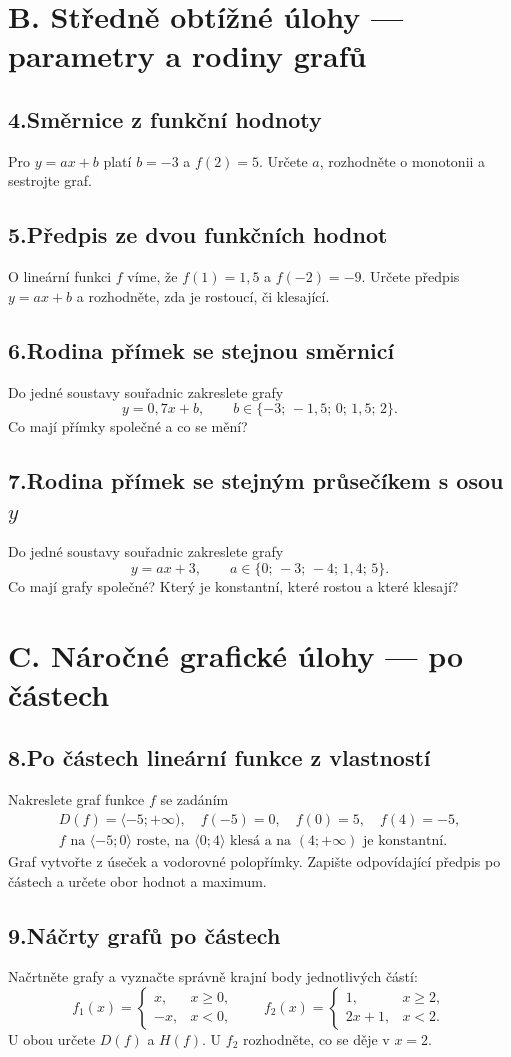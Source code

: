 \documentclass[11pt,a4paper]{article}
\newcommand{\uloha}[2]{\par\needspace{4\baselineskip}\subsection*{#1\enspace #2}}
\begin{document}
\section*{B. Středně obtížné úlohy --- parametry a rodiny grafů}
\uloha{4.}{Směrnice z funkční hodnoty}
Pro $y=ax+b$ platí $b=-3$ a $f(2)=5$. Určete $a$, rozhodněte o monotonii a sestrojte graf.
\uloha{5.}{Předpis ze dvou funkčních hodnot}
O lineární funkci $f$ víme, že $f(1)=1{,}5$ a $f(-2)=-9$. Určete předpis $y=ax+b$ a rozhodněte, zda je rostoucí, či klesající.
\uloha{6.}{Rodina přímek se stejnou směrnicí}
Do jedné soustavy souřadnic zakreslete grafy
\[ y=0{,}7x+b,\qquad b\in\{-3;\,-1{,}5;\,0;\,1{,}5;\,2\}. \]
Co mají přímky společné a co se mění?
\uloha{7.}{Rodina přímek se stejným průsečíkem s osou $y$}
Do jedné soustavy souřadnic zakreslete grafy
\[ y=ax+3,\qquad a\in\{0;\,-3;\,-4;\,1{,}4;\,5\}. \]
Co mají grafy společné? Který je konstantní, které rostou a které klesají?
\section*{C. Náročné grafické úlohy --- po částech}
\uloha{8.}{Po částech lineární funkce z vlastností}
Nakreslete graf funkce $f$ se zadáním
\[
\begin{gathered}
D(f)=\langle-5;+\infty),\quad f(-5)=0,\quad f(0)=5,\quad f(4)=-5,\\
\text{$f$ na $\langle-5;0\rangle$ roste, na $\langle0;4\rangle$ klesá a na $(4;+\infty)$ je konstantní.}
\end{gathered}
\]
Graf vytvořte z úseček a vodorovné polopřímky. Zapište odpovídající předpis po částech a určete obor hodnot a maximum.
\uloha{9.}{Náčrty grafů po částech}
Načrtněte grafy a vyznačte správně krajní body jednotlivých částí:
\[
 f_1(x)=\begin{cases}x,&x\ge0,\\-x,&x<0,\end{cases}
\qquad
 f_2(x)=\begin{cases}1,&x\ge2,\\2x+1,&x<2.\end{cases}
\]
U obou určete $D(f)$ a $H(f)$. U $f_2$ rozhodněte, co se děje v $x=2$.
\end{document}
